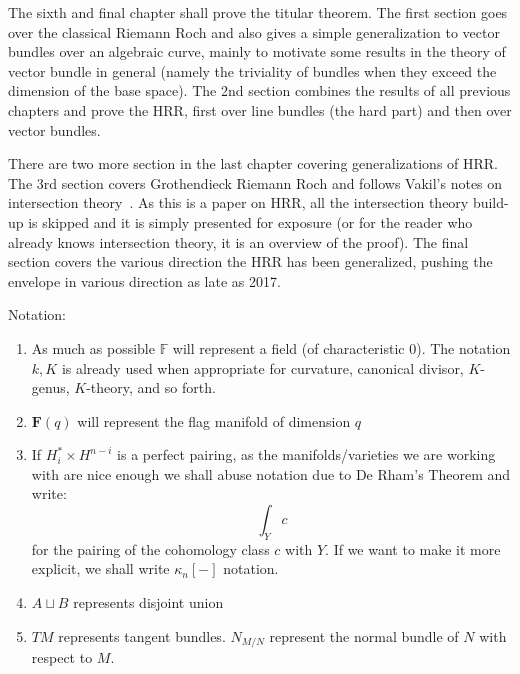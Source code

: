 \documentclass{book}
\newcommand{\F}{{\mathbb{F}}}
\newcommand{\dcup}{\sqcup}
\begin{document}
The sixth and final chapter shall prove the titular theorem. The first section goes over the classical Riemann
Roch and also gives a simple generalization to vector bundles over an algebraic curve, mainly to motivate some
results in the theory of vector bundle in general (namely the triviality of bundles when they exceed the
dimension of the base space). The 2nd section combines the results of all previous chapters and prove the HRR,
first over line bundles (the hard part) and then over vector bundles.

There are two more section in the last chapter covering generalizations of HRR. The 3rd section covers
Grothendieck Riemann Roch and follows Vakil's notes on intersection theory~\cite{vakilIntersectionTheory}. As
this is a paper on HRR, all the intersection theory build-up is skipped and it is simply presented for exposure
(or for the reader who already knows intersection theory, it is an overview of the proof). The final section
covers the various direction the HRR has been generalized, pushing the envelope in various direction as late
as 2017.

%
%

Notation:
\begin{enumerate}
  \item As much as possible $\F$ will represent a field (of characteristic $0$). The notation $k, K$ is
    already used when appropriate for curvature, canonical divisor, $K$-genus, $K$-theory, and so forth.
  \item $\mathbf{F}(q)$ will represent the flag manifold of dimension $q$
  \item If $H_i^* \times H^{n-i}$ is a perfect pairing, as the manifolds/varieties we are working with are
    nice enough we shall abuse notation due to De Rham's Theorem and write:
    \[
      \int_Y c
    \]
    for the pairing of the cohomology class $c$ with $Y$. If we want to make it more explicit, we shall write
    $\kappa_n[-]$ notation.
   \item $A\dcup B$ represents disjoint union
   \item $TM$ represents tangent bundles. $N_{M/N}$ represent the normal bundle of $N$ with respect
     to $M$.
\end{enumerate}
\end{document}
